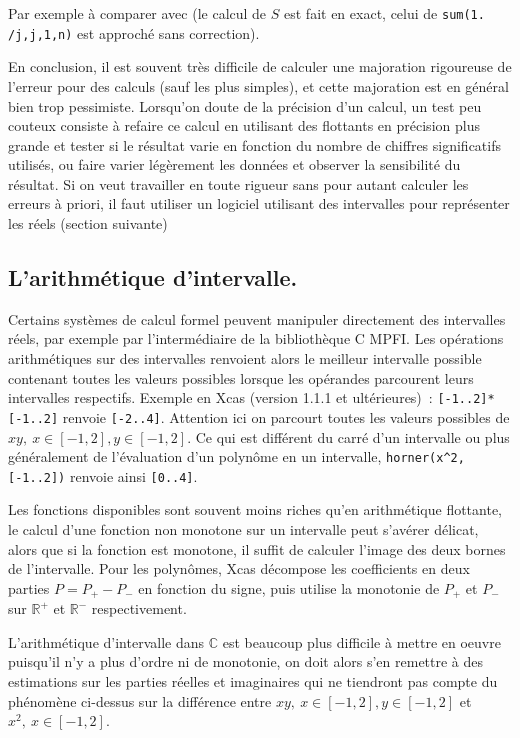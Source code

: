 \documentclass[a4paper,11pt]{article}
\begin{document}
\begin{giacjshere}
Par exemple
\`a comparer avec
(le calcul de $S$ est fait en exact, celui de {\tt sum(1. /j,j,1,n)}
est approch\'e sans correction).

En conclusion, il est souvent tr\`es difficile de calculer une majoration
rigoureuse de l'erreur pour des calculs (sauf les plus simples), et cette
majoration est en g\'en\'eral bien trop pessimiste.
Lorsqu'on doute de la précision d'un calcul, un test peu couteux consiste
à refaire ce calcul en utilisant des flottants en précision plus
grande et tester si le résultat varie en fonction du nombre de chiffres
significatifs utilisés, ou faire varier l\'eg\`erement
les donn\'ees et observer la sensibilit\'e du r\'esultat.
Si on veut travailler en toute rigueur sans
pour autant calculer les erreurs à priori, il faut utiliser un logiciel
utilisant des intervalles pour représenter les réels (section suivante)

\subsection{L'arithm\'etique d'intervalle.}
Certains syst\`emes de calcul formel peuvent manipuler directement
des intervalles r\'eels, par exemple par l'interm\'ediaire de la
bibliothèque C MPFI. Les op\'erations arithm\'etiques sur des
intervalles renvoient alors le meilleur intervalle possible contenant
toutes les valeurs possibles lorsque les op\'erandes parcourent
leurs intervalles respectifs.
Exemple en Xcas (version 1.1.1 et ult\'erieures)~:
\verb|[-1..2]*[-1..2]| renvoie \verb|[-2..4]|.
Attention ici on parcourt toutes les valeurs possibles de 
$xy, \ x \in [-1,2], y \in [-1,2]$. Ce qui est diff\'erent du carr\'e
d'un intervalle ou plus g\'en\'eralement de l'\'evaluation
d'un polyn\^ome en un intervalle, \verb|horner(x^2,[-1..2])|
renvoie ainsi \verb|[0..4]|.

Les fonctions disponibles sont souvent moins riches qu'en
arithm\'etique flottante, le calcul d'une fonction non monotone
sur un intervalle peut s'av\'erer d\'elicat, alors que si la fonction
est monotone, il suffit de calculer l'image des deux bornes
de l'intervalle. Pour les polyn\^omes, Xcas d\'ecompose
les coefficients en deux parties $P=P_+-P_-$ en fonction
du signe, puis utilise la monotonie de $P_+$ et $P_-$ sur
$\mathbb{R}^+$ et $\mathbb{R}^-$ respectivement.

L'arithm\'etique d'intervalle dans $\mathbb{C}$ est beaucoup plus difficile
\`a mettre en oeuvre puisqu'il n'y a plus d'ordre ni de monotonie,
on doit alors s'en remettre \`a des estimations sur les parties
r\'eelles et imaginaires qui ne tiendront pas compte du ph\'enom\`ene
ci-dessus sur la diff\'erence entre $xy, \ x \in [-1,2], y \in [-1,2]$
et $x^2, \ x \in [-1,2]$.


\end{giacjshere}
\end{document}
